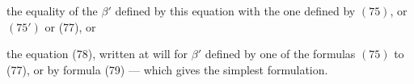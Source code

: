 the equality of the $\beta'$ defined by this equation with  the one defined by  $(75)$, or $(75')$ or (77), or

the equation (78), written at will for $\beta'$ defined by one of the formulas $(75)$ to (77), or by formula (79) --- which gives the simplest formulation.
